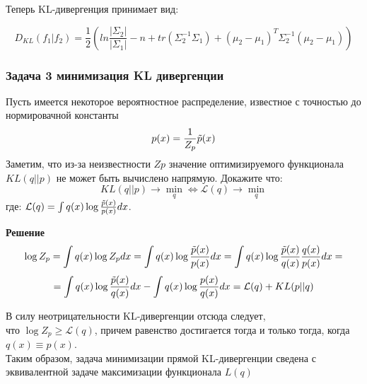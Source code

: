 Теперь KL-дивергенция принимает вид:

\[
D_{KL}(f_1 | f_2) = \frac{1}{2} (ln\frac{|\Sigma_2|}{|\Sigma_1|} - n + tr(\Sigma_2^{-1}\Sigma_1) + (\mu_2 - \mu_1)^T\Sigma_2^{-1}(\mu_2 - \mu_1))
\]

\subsubsection*{Задача 3 минимизация KL дивергенции}
Пусть имеется некоторое вероятностное распределение, известное с точностью до нормировачной константы 
\[p(x) = \frac{1}{Z_p}\Tilde{p}(x) \]
Заметим, что из-за неизвестности $Zp$ значение оптимизируемого
функционала $KL(q||p)$ не может быть вычислено напрямую.
Докажите что: 
\[KL(q||p) \rightarrow \underset{q}{\min} \Leftrightarrow \mathcal{L}(q) \rightarrow \underset{q}{\min}\] 
где: $\mathcal{L}(q) = \int q(x) \log \frac{\Tilde{p}(x)}{p(x)}dx$.


\textbf{Решение}
\[
\log Z_p = \int q(x) \log Z_pdx  = \int q(x) \log \frac{\Tilde{p}(x)}{p(x)}dx = \int q(x) \log \frac{\Tilde{p}(x)}{q(x)}\frac{q(x)}{p(x)}dx
= \]
\[
= \int q(x) \log \frac{\Tilde{p}(x)}{q(x)}dx - \int q(x) \log \frac{p(x)}{q(x)}dx = \mathcal{L}(q) + KL(p||q)
\]

В силу неотрицательности KL-дивергенции отсюда следует,\\ что $\log Z_p \geq \mathcal{L}(q)$, причем равенство
достигается тогда и только тогда, когда $q(x) \equiv p(x)$. \\ 
Таким образом, задача минимизации прямой KL-дивергенции сведена с эквивалентной задаче максимизации функционала $L(q)$
